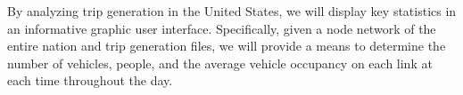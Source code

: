 By analyzing trip generation in the United States, we will display key statistics in an informative graphic user interface. Specifically, given a node network of the entire nation and trip generation files, we will provide a means to determine the number of vehicles, people, and the average vehicle occupancy on each link at each time throughout 
the day. 
